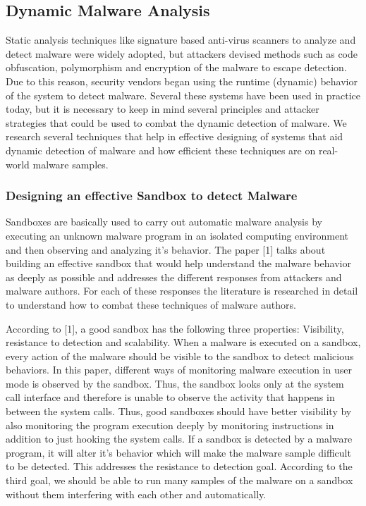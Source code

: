 \documentclass[11pt]{article}
\begin{document}
	
	\subsection{Dynamic Malware Analysis}
	Static analysis techniques like signature based anti-virus scanners to analyze and detect malware were widely adopted, but attackers devised methods such as code obfuscation, polymorphism and encryption of the malware to escape detection. Due to this reason, security vendors began using the runtime (dynamic) behavior of the system to detect malware. Several these systems have been used in practice today, but it is necessary to keep in mind several principles and attacker strategies that could be used to combat the dynamic detection of malware. We research several techniques that help in effective designing of systems that aid dynamic detection of malware and how efficient these techniques are on real-world malware samples.
		\subsubsection{Designing an effective Sandbox to detect Malware}
		Sandboxes are basically used to carry out automatic malware analysis by executing an unknown malware program in an isolated computing environment and then observing and analyzing it’s behavior. The paper [1] talks about building an effective sandbox that would help understand the malware behavior as deeply as possible and addresses the different responses from attackers and malware authors. For each of these responses the literature is researched in detail to understand how to combat these techniques of malware authors.

		According to [1], a good sandbox has the following three properties: Visibility, resistance to detection and scalability. When a malware is executed on a sandbox, every action of the malware should be visible to the sandbox to detect malicious behaviors. In this paper, different ways of monitoring malware execution in user mode is observed by the sandbox. Thus, the sandbox looks only at the system call interface and therefore is unable to observe the activity that happens in between the system calls. Thus, good sandboxes should have better visibility by also monitoring the program execution deeply by monitoring instructions in addition to just hooking the system calls. If a sandbox is detected by a malware program, it will alter it’s behavior which will make the malware sample difficult to be detected. This addresses the resistance to detection goal. According to the third goal, we should be able to run many samples of the malware on a sandbox without them interfering with each other and automatically.
\end{document}
